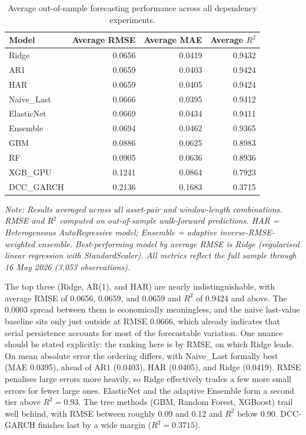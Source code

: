 \begin{table}[H]
    \centering
    \caption{Average out-of-sample forecasting performance across all dependency experiments.}
    \label{tab:model_ranking_summary}
    \begin{tabular}{lrrr}
        \toprule
        Model & Average RMSE & Average MAE & Average $R^2$ \\
        \midrule
        Ridge      & 0.0656 & 0.0419 & 0.9432 \\
        AR1        & 0.0659 & 0.0403 & 0.9424 \\
        HAR        & 0.0659 & 0.0405 & 0.9424 \\
        Naive\_Last & 0.0666 & 0.0395 & 0.9412 \\
        ElasticNet & 0.0669 & 0.0434 & 0.9411 \\
        Ensemble   & 0.0694 & 0.0462 & 0.9365 \\
        GBM        & 0.0886 & 0.0625 & 0.8983 \\
        RF         & 0.0905 & 0.0636 & 0.8936 \\
        XGB\_GPU   & 0.1241 & 0.0864 & 0.7923 \\
        DCC\_GARCH & 0.2136 & 0.1683 & 0.3715 \\
        \bottomrule
    \end{tabular}
    \par\smallskip\noindent\footnotesize{\textit{Note: Results averaged across all asset-pair and window-length combinations. RMSE and R$^2$ computed on out-of-sample walk-forward predictions. HAR = Heterogeneous AutoRegressive model; Ensemble = adaptive inverse-RMSE-weighted ensemble. Best-performing model by average RMSE is Ridge (regularised linear regression with StandardScaler). All metrics reflect the full sample through 16 May 2026 (3{,}053 observations).}}
\end{table}

The top three (Ridge, AR(1), and HAR) are nearly indistinguishable, with average RMSE of 0.0656, 0.0659, and 0.0659 and $R^2$ of 0.9424 and above. The 0.0003 spread between them is economically meaningless, and the naive last-value baseline sits only just outside at RMSE 0.0666, which already indicates that serial persistence accounts for most of the forecastable variation. One nuance should be stated explicitly: the ranking here is by RMSE, on which Ridge leads. On mean absolute error the ordering differs, with Naive\_Last formally best (MAE 0.0395), ahead of AR1 (0.0403), HAR (0.0405), and Ridge (0.0419). RMSE penalises large errors more heavily, so Ridge effectively trades a few more small errors for fewer large ones. ElasticNet and the adaptive Ensemble form a second tier above $R^2 = 0.93$. The tree methods (GBM, Random Forest, XGBoost) trail well behind, with RMSE between roughly 0.09 and 0.12 and $R^2$ below 0.90. DCC-GARCH finishes last by a wide margin ($R^2 = 0.3715$).

